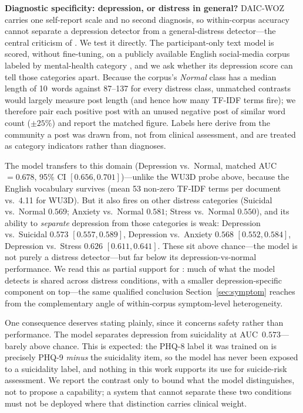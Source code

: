\documentclass[5p,twocolumn]{elsarticle}
\begin{document}
\textbf{Diagnostic specificity: depression, or distress in general?}
DAIC-WOZ carries one self-report scale and no second diagnosis, so
within-corpus accuracy cannot separate a depression detector from a
general-distress detector---the central criticism of
\cite{patapati2025invalid}. We test it directly. The participant-only
text model is scored, without fine-tuning, on a publicly available
English social-media corpus labeled by mental-health category
\cite{sarkar2022mentalhealth}, and we ask whether its
depression score can tell those categories apart. Because the corpus's
\emph{Normal} class has a median length of 10~words against 87--137 for
every distress class, unmatched contrasts would largely measure post
length (and hence how many TF-IDF terms fire); we therefore pair each
positive post with an unused negative post of similar word count
($\pm25\%$) and report the matched figure. Labels here derive from the
community a post was drawn from, not from clinical assessment, and are
treated as category indicators rather than diagnoses.

The model transfers to this domain (Depression vs.\ Normal, matched
AUC~$=0.678$, 95\% CI $[0.656, 0.701]$)---unlike the WU3D probe above,
because the English vocabulary survives (mean 53 non-zero TF-IDF terms
per document vs.\ 4.11 for WU3D). But it also fires on other distress
categories (Suicidal vs.\ Normal $0.569$; Anxiety vs.\ Normal $0.581$;
Stress vs.\ Normal $0.550$), and its ability to \emph{separate}
depression from those categories is weak: Depression vs.\ Suicidal
$0.573$ $[0.557, 0.589]$, Depression vs.\ Anxiety $0.568$
$[0.552, 0.584]$, Depression vs.\ Stress $0.626$ $[0.611, 0.641]$.
These sit above chance---the model is not purely a distress
detector---but far below its depression-vs-normal performance. We read
this as partial support for \cite{patapati2025invalid}: much of what the
model detects is shared across distress conditions, with a smaller
depression-specific component on top---the same qualified conclusion
Section~\ref{sec:symptom} reaches from the complementary angle of
within-corpus symptom-level heterogeneity.

One consequence deserves stating plainly, since it concerns safety
rather than performance. The model separates depression from
suicidality at AUC~$0.573$---barely above chance. This is expected: the
PHQ-8 label it was trained on is precisely PHQ-9 \emph{minus} the
suicidality item, so the model has never been exposed to a suicidality
label, and nothing in this work supports its use for suicide-risk
assessment. We report the contrast only to bound what the model
distinguishes, not to propose a capability; a system that cannot
separate these two conditions must not be deployed where that
distinction carries clinical weight.
\end{document}
